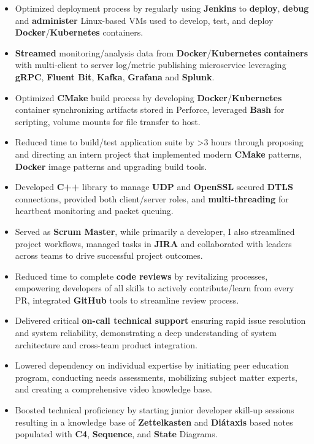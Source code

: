 \documentclass[a4paper]{article}
\begin{document}
\begin{itemize}
	\item Optimized deployment process by regularly using \textbf{Jenkins} to \textbf{deploy}, \textbf{debug} and \textbf{administer} Linux-based VMs used to develop, test, and deploy \textbf{Docker}/\textbf{Kubernetes} containers.
	\item \textbf{Streamed} monitoring/analysis data from \textbf{Docker}/\textbf{Kubernetes} \textbf{containers} with multi-client to server log/metric publishing microservice leveraging \textbf{gRPC}, \textbf{Fluent Bit}, \textbf{Kafka}, \textbf{Grafana} and \textbf{Splunk}.
	\item Optimized \textbf{CMake} build process by developing \textbf{Docker}/\textbf{Kubernetes} container synchronizing artifacts stored in Perforce, leveraged \textbf{Bash} for scripting, volume mounts for file transfer to host.
	\item Reduced time to build/test application suite by >3 hours through proposing and directing an intern project that implemented modern \textbf{CMake} patterns, \textbf{Docker} image patterns and upgrading build tools.
	\item Developed \textbf{C++} library to manage \textbf{UDP} and \textbf{OpenSSL} secured \textbf{DTLS} connections, provided both client/server roles, and \textbf{multi-threading} for heartbeat monitoring and packet queuing.
	\item Served as \textbf{Scrum Master}, while primarily a developer, I also streamlined project workflows, managed tasks in \textbf{JIRA} and collaborated with leaders across teams to drive successful project outcomes.
	\item Reduced time to complete \textbf{code reviews} by revitalizing processes, empowering developers of all skills to actively contribute/learn from every PR, integrated \textbf{GitHub} tools to streamline review process.
	\item Delivered critical \textbf{on-call technical support} ensuring rapid issue resolution and system reliability, demonstrating a deep understanding of system architecture and cross-team product integration.
	\item Lowered dependency on individual expertise by initiating peer education program, conducting needs assessments, mobilizing subject matter experts, and creating a comprehensive video knowledge base.
	\item Boosted technical proficiency by starting junior developer skill-up sessions resulting in a knowledge base of \textbf{Zettelkasten} and \textbf{Diátaxis} based notes populated with \textbf{C4}, \textbf{Sequence}, and \textbf{State} Diagrams.

\end{itemize}
\end{document}
